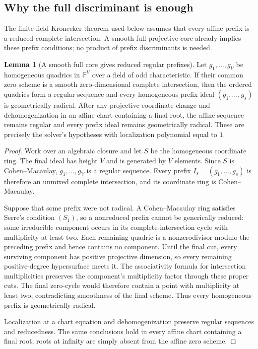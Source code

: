 \documentclass[11pt,a4paper]{article}
\theoremstyle{definition}
\newtheorem{lemma}[theorem]{Lemma}
\theoremstyle{remark}
\newcommand{\PP}{\mathbb P}
\begin{document}
\subsection{Why the full discriminant is enough}

The finite-field Kronecker theorem used below assumes that every affine prefix is a reduced complete intersection.  A smooth full projective core already implies these prefix conditions; no product of prefix discriminants is needed.

\begin{lemma}[A smooth full core gives reduced regular prefixes]\label{lem:full-implies-prefix}
Let $g_1,\ldots,g_V$ be homogeneous quadrics in $\PP^V$ over a field of odd characteristic.  If their common zero scheme is a smooth zero-dimensional complete intersection, then the ordered quadrics form a regular sequence and every homogeneous prefix ideal $(g_1,\ldots,g_s)$ is geometrically radical.  After any projective coordinate change and dehomogenization in an affine chart containing a final root, the affine sequence remains regular and every prefix ideal remains geometrically radical.  These are precisely the solver's hypotheses with localization polynomial equal to $1$.
\end{lemma}

\begin{proof}
Work over an algebraic closure and let $S$ be the homogeneous coordinate ring.  The final ideal has height $V$ and is generated by $V$ elements.  Since $S$ is Cohen--Macaulay, $g_1,\ldots,g_V$ is a regular sequence.  Every prefix $I_s=(g_1,\ldots,g_s)$ is therefore an unmixed complete intersection, and its coordinate ring is Cohen--Macaulay.

Suppose that some prefix were not radical.  A Cohen--Macaulay ring satisfies Serre's condition $(S_1)$, so a nonreduced prefix cannot be generically reduced: some irreducible component occurs in its complete-intersection cycle with multiplicity at least two.  Each remaining quadric is a nonzerodivisor modulo the preceding prefix and hence contains no component.  Until the final cut, every surviving component has positive projective dimension, so every remaining positive-degree hypersurface meets it.  The associativity formula for intersection multiplicities preserves the component's multiplicity factor through these proper cuts.  The final zero-cycle would therefore contain a point with multiplicity at least two, contradicting smoothness of the final scheme.  Thus every homogeneous prefix is geometrically radical.

Localization at a chart equation and dehomogenization preserve regular sequences and reducedness.  The same conclusions hold in every affine chart containing a final root; roots at infinity are simply absent from the affine zero scheme.
\end{proof}
\end{document}

